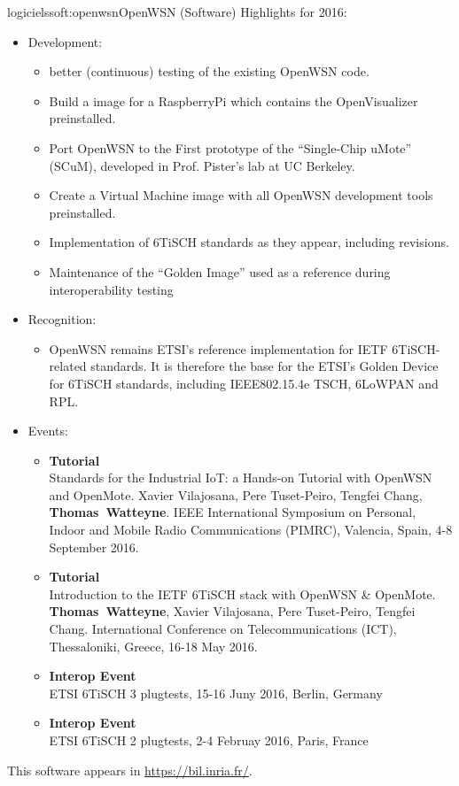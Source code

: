 \documentclass{ra2016}
\newcommand{\thomas}           {\textbf{Thomas~Watteyne}}
\begin{document}
\begin{module}{logiciels}{soft:openwsn}{OpenWSN (Software)}
Highlights for 2016:
\begin{itemize}
    \item Development:
        \begin{itemize}
            \item better (continuous) testing of the existing OpenWSN code.
            \item Build a image for a RaspberryPi which contains the OpenVisualizer preinstalled.
            \item Port OpenWSN to the First prototype of the ``Single-Chip uMote'' (SCuM), developed in Prof. Pister's lab at UC Berkeley.
            \item Create a Virtual Machine image with all OpenWSN development tools preinstalled.
            \item Implementation of 6TiSCH standards as they appear, including revisions.
            \item Maintenance of the ``Golden Image'' used as a reference during interoperability testing
        \end{itemize}
    \item Recognition:
        \begin{itemize}
            \item OpenWSN remains ETSI's reference implementation for IETF 6TiSCH-related standards. It is therefore the base for the ETSI's Golden Device for 6TiSCH standards, including IEEE802.15.4e TSCH, 6LoWPAN and RPL.
        \end{itemize}
    \item Events:
        \begin{itemize}
            \item \textbf{Tutorial}\\
                Standards for the Industrial IoT: a Hands-on Tutorial with OpenWSN and OpenMote.
                Xavier Vilajosana, Pere Tuset-Peiro, Tengfei Chang, \thomas.
                IEEE International Symposium on Personal, Indoor and Mobile Radio Communications (PIMRC), Valencia, Spain, 4-8 September 2016.
            \item \textbf{Tutorial}\\
                Introduction to the IETF 6TiSCH stack with OpenWSN \& OpenMote.
                \thomas, Xavier Vilajosana, Pere Tuset-Peiro, Tengfei Chang.
                International Conference on Telecommunications (ICT), Thessaloniki, Greece, 16-18 May 2016.
            \item \textbf{Interop Event}\\
                ETSI 6TiSCH 3 plugtests, 15-16 Juny 2016, Berlin, Germany
            \item \textbf{Interop Event}\\
                ETSI 6TiSCH 2 plugtests, 2-4 Februay 2016, Paris, France
        \end{itemize}
\end{itemize}

This software appears in \url{https://bil.inria.fr/}.

\end{module}
\end{document}
